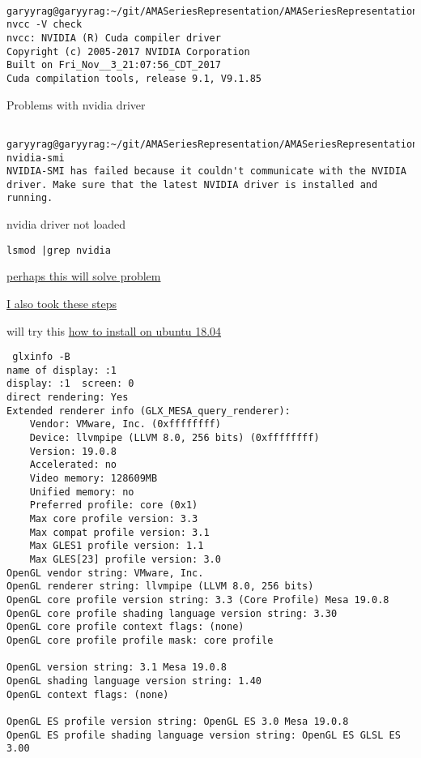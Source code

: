 \documentclass[hyperref,idxtotoc]{labbook}
\begin{document}
\begin{verbatim}
 
garyyrag@garyyrag:~/git/AMASeriesRepresentation/AMASeriesRepresentation$ nvcc -V check
nvcc: NVIDIA (R) Cuda compiler driver
Copyright (c) 2005-2017 NVIDIA Corporation
Built on Fri_Nov__3_21:07:56_CDT_2017
Cuda compilation tools, release 9.1, V9.1.85
\end{verbatim}

Problems with nvidia driver
\begin{verbatim}

garyyrag@garyyrag:~/git/AMASeriesRepresentation/AMASeriesRepresentation$ nvidia-smi
NVIDIA-SMI has failed because it couldn't communicate with the NVIDIA driver. Make sure that the latest NVIDIA driver is installed and running.

\end{verbatim}

nvidia driver  not loaded

\begin{verbatim}
lsmod |grep nvidia
\end{verbatim}

\href{https://askubuntu.com/questions/1048274/ubuntu-18-04-stopped-working-with-nvidia-drivers}{perhaps this will solve problem}


\href{https://devtalk.nvidia.com/default/topic/1047416/linux/nvidia-driver-is-not-loaded-ubuntu-18-10-/}{I also took these steps}

will try this
\href{https://askubuntu.com/questions/61396/how-do-i-install-the-nvidia-drivers}{how to install on ubuntu 18.04}

\begin{verbatim}
 glxinfo -B
name of display: :1
display: :1  screen: 0
direct rendering: Yes
Extended renderer info (GLX_MESA_query_renderer):
    Vendor: VMware, Inc. (0xffffffff)
    Device: llvmpipe (LLVM 8.0, 256 bits) (0xffffffff)
    Version: 19.0.8
    Accelerated: no
    Video memory: 128609MB
    Unified memory: no
    Preferred profile: core (0x1)
    Max core profile version: 3.3
    Max compat profile version: 3.1
    Max GLES1 profile version: 1.1
    Max GLES[23] profile version: 3.0
OpenGL vendor string: VMware, Inc.
OpenGL renderer string: llvmpipe (LLVM 8.0, 256 bits)
OpenGL core profile version string: 3.3 (Core Profile) Mesa 19.0.8
OpenGL core profile shading language version string: 3.30
OpenGL core profile context flags: (none)
OpenGL core profile profile mask: core profile

OpenGL version string: 3.1 Mesa 19.0.8
OpenGL shading language version string: 1.40
OpenGL context flags: (none)

OpenGL ES profile version string: OpenGL ES 3.0 Mesa 19.0.8
OpenGL ES profile shading language version string: OpenGL ES GLSL ES 3.00

\end{verbatim}
\end{document}
